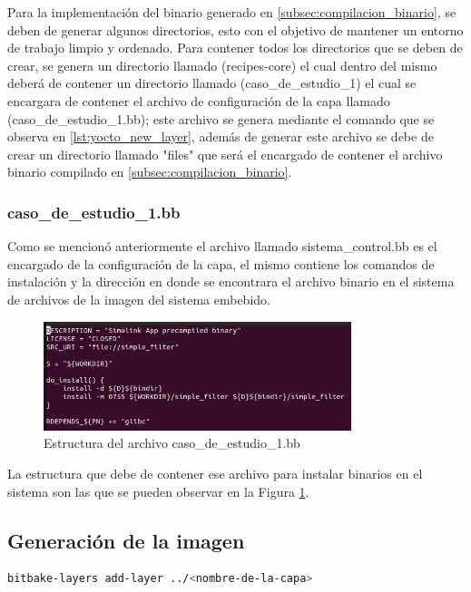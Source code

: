 Para la implementación del binario generado en \ref{subsec:compilacion_binario}, se deben de generar algunos directorios, esto con el objetivo de mantener un entorno de trabajo limpio y ordenado. Para contener todos los directorios que se deben de crear, se genera un directorio llamado (recipes-core) el cual dentro del mismo deberá de contener un directorio llamado (caso\_de\_estudio\_1) el cual se encargara de contener el archivo de configuración de la capa llamado (caso\_de\_estudio\_1.bb); este archivo se genera mediante el comando que se observa en \ref{lst:yocto_new_layer}, además de generar este archivo se debe de crear un directorio llamado "files" que será el encargado de contener el archivo binario compilado en \ref{subsec:compilacion_binario}.

\subsubsection{caso\_de\_estudio\_1.bb}

Como se mencionó anteriormente el archivo llamado sistema\_control.bb es el encargado de la configuración de la capa, el mismo contiene los comandos de instalación y la dirección en donde se encontrara el archivo binario en el sistema de archivos de la imagen del sistema embebido.

\begin{figure}[h!]
    \centering
    \includegraphics[width=0.8\textwidth]{fig/especifico_2/bbfilestructure.jpg}
    \caption{Estructura del archivo caso\_de\_estudio\_1.bb}
    \label{fig:estructura_archivo_bb}
\end{figure}

La estructura que debe de contener ese archivo para instalar binarios en el sistema son las que se pueden observar en la Figura \ref{fig:estructura_archivo_bb}.

\subsection{Generación de la imagen}\label{subsec:generacion_imagen_minima}

\begin{lstlisting}[language=bash, caption={Generar archivos de desarrollador, Yocto }, label=lst:yocto_developer_image]
    bitbake-layers add-layer ../<nombre-de-la-capa>
\end{lstlisting}

